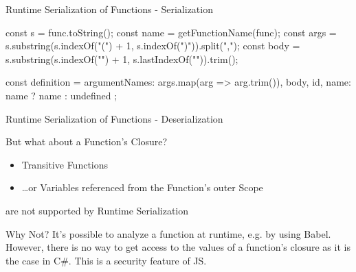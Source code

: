 \begin{frame}{Runtime Serialization of Functions - Serialization}
	\begin{javascriptcode}
const s = func.toString();
const name = getFunctionName(func);
const args = s.substring(s.indexOf("(") + 1, s.indexOf(")")).split(",");
const body = s.substring(s.indexOf("{") + 1, s.lastIndexOf("}")).trim();

const definition = {
	argumentNames: args.map(arg => arg.trim()),
	body,
	id,
	name: name ? name : undefined
};
\end{javascriptcode}

\end{frame}

\begin{frame}{Runtime Serialization of Functions - Deserialization}
\end{frame}

\begin{frame}{But what about a Function's Closure?}
\begin{itemize}
	\item Transitive Functions
	\item \dots or Variables referenced from the Function's outer Scope
\end{itemize}

are not supported by Runtime Serialization

\begin{block}{Why Not?}
It's possible to analyze a function at runtime, e.g. by using Babel. However, there is no way to get access to the values of a function's closure as it is the case in C\#. This is a security feature of JS.	
\end{block}
\end{frame}

